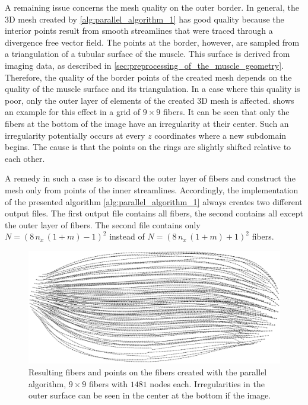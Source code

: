 A remaining issue concerns the mesh quality on the outer border. In general, the 3D mesh created by \cref{alg:parallel_algorithm_1} has good quality because the interior points result from smooth streamlines that were traced through a divergence free vector field. 
The points at the border, however, are sampled from a triangulation of a tubular surface of the muscle. This surface is derived from imaging data, as described in \cref{sec:preprocessing_of_the_muscle_geometry}. Therefore, the quality of the border points of the created mesh depends on the quality of the muscle surface and its triangulation. In a case where this quality is poor, only the outer layer of elements of the created 3D mesh is affected.  shows an example for this effect in a grid of $9 \times 9$ fibers. It can be seen that only the fibers at the bottom of the image have an irregularity at their center. Such an irregularity potentially occurs at every $z$ coordinates where a new subdomain begins. The cause is that the points on the rings are slightly shifted relative to each other.

A remedy in such a case is to discard the outer layer of fibers and construct the mesh only from points of the inner streamlines.
Accordingly, the implementation of the presented algorithm \cref{alg:parallel_algorithm_1} always creates two different output files. The first output file contains all fibers, the second contains all except the outer layer of fibers. The second file contains only $N=(8\,n_x\,(1+m)-1)^2$ instead of $N=(8\,n_x\,(1+m)+1)^2$ fibers.
\begin{figure}%
  \centering%
  \includegraphics[width=\textwidth]{images/parallel_fiber_estimation/poor_border_33x33.png}%
  \caption{Resulting fibers and points on the fibers created with the parallel algorithm, $9\times 9$ fibers with $1481$ nodes each. Irregularities in the outer surface can be seen in the  center at the bottom if the image.}%
  \label{fig:poor_border_33x33}%
\end{figure}%

